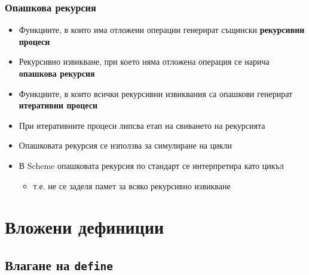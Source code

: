 \documentclass[alsotrans]{beamerswitch}
\begin{document}
\begin{frame}
  \frametitle{Опашкова рекурсия}

  \begin{itemize}[<+->]
  \item Функциите, в които има отложени операции генерират същински \textbf{рекурсивни процеси}
  \item Рекурсивно извикване, при което няма отложена операция се нарича \textbf{опашкова рекурсия}
  \item Функциите, в които всички рекурсивни извиквания са опашкови генерират \textbf{итеративни процеси}
  \item При итеративните процеси липсва етап на свиването на рекурсията
  \item Опашковата рекурсия се използва за симулиране на цикли
  \item В Scheme опашковата рекурсия \alert{по стандарт} се интерпретира като цикъл
    \begin{itemize}
    \item т.е. не се заделя памет за всяко рекурсивно извикване
    \end{itemize}
  \end{itemize}
\end{frame}

\section{Вложени дефиниции}



\subsection{Влагане на \tt{define}}
\end{document}
